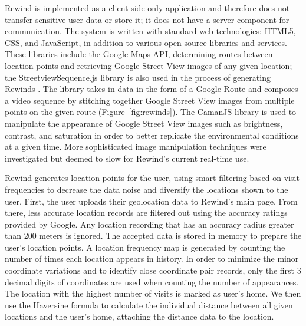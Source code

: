 \documentclass{sigchi}
\begin{document}
Rewind is implemented as a client-side only application and therefore does not transfer sensitive user data or store it; it does not have a server component for communication. The system is written with standard web technologies: HTML5, CSS, and JavaScript, in addition to various open source libraries and services. These libraries include the Google Maps API, determining routes between location points and retrieving Google Street View images of any given location; the StreetviewSequence.js library is also used in the process of generating Rewinds \cite{streetviewsequence}. The library takes in data in the form of a Google Route and composes a video sequence by stitching together Google Street View images from multiple points on the given route (Figure~\ref{fig:rewinds}). The CamanJS library \cite{caman} is used to manipulate the appearance of Google Street View images such as brightness, contrast, and saturation in order to better replicate the environmental conditions at a given time. More sophisticated image manipulation techniques were investigated \cite{laffont2014transient} but deemed to slow for Rewind's current real-time use.

Rewind generates location points for the user, using smart filtering based on visit frequencies to decrease the data noise and diversify the locations shown to the user. First, the user uploads their geolocation data to Rewind's main page. From there, less accurate location records are filtered out using the accuracy ratings provided by Google. Any location recording that has an accuracy radius greater than 200 meters is ignored. The accepted data is stored in memory to prepare the user's location points. A location frequency map is generated by counting the number of times each location appears in history. In order to minimize the minor coordinate variations and to identify close coordinate pair records, only the first 3 decimal digits of coordinates are used when counting the number of appearances. The location with the highest number of visits is marked as user's home. We then use the Haversine formula to calculate the individual distance between all given locations and the user's home, attaching the distance data to the location. %
\end{document}
